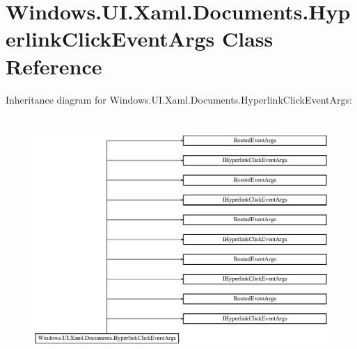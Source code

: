 \hypertarget{class_windows_1_1_u_i_1_1_xaml_1_1_documents_1_1_hyperlink_click_event_args}{}\section{Windows.\+U\+I.\+Xaml.\+Documents.\+Hyperlink\+Click\+Event\+Args Class Reference}
\label{class_windows_1_1_u_i_1_1_xaml_1_1_documents_1_1_hyperlink_click_event_args}
Inheritance diagram for Windows.\+U\+I.\+Xaml.\+Documents.\+Hyperlink\+Click\+Event\+Args\+:\begin{figure}[H]
\begin{center}
\leavevmode
\includegraphics[height=9.390244cm]{class_windows_1_1_u_i_1_1_xaml_1_1_documents_1_1_hyperlink_click_event_args}
\end{center}
\end{figure}
